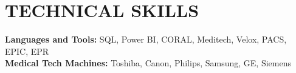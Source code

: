 
\section{\textcolor{airforceblue}{TECHNICAL SKILLS}}
 \begin{itemize}[leftmargin=0in, label={}]
    \small{\item{
     \textbf{Languages and Tools:}{ SQL, Power BI, CORAL, Meditech, Velox, PACS, EPIC, EPR} \\
      \vspace{1.2pt}
     \textbf{Medical Tech Machines:}{ Toshiba, Canon, Philips, Samsung, GE, Siemens} \\
      \vspace{1.2pt}
     }}
 \end{itemize}
 \vspace{-16pt}
